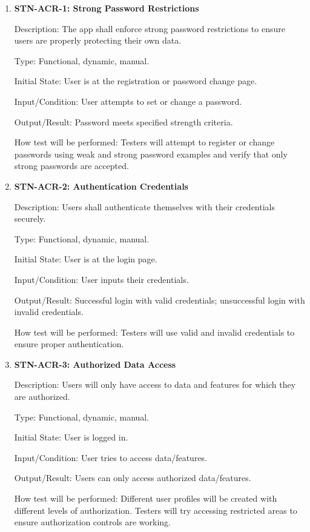 \documentclass[12pt, titlepage]{article}
\begin{document}
    \begin{enumerate}

        \item {\textbf{STN-ACR-1: Strong Password Restrictions}}

        Description: The app shall enforce strong password restrictions to ensure users are properly protecting their own data.

        Type: Functional, dynamic, manual.

        Initial State: User is at the registration or password change page.

        Input/Condition: User attempts to set or change a password.

        Output/Result: Password meets specified strength criteria.

        How test will be performed: Testers will attempt to register or change passwords using weak and strong password examples and verify that only strong passwords are accepted.


        \item{\textbf{STN-ACR-2: Authentication Credentials}}

        Description:  Users shall authenticate themselves with their credentials securely.

        Type: Functional, dynamic, manual.

        Initial State: User is at the login page.

        Input/Condition: User inputs their credentials.

        Output/Result: Successful login with valid credentials; unsuccessful login with invalid credentials.

        How test will be performed: Testers will use valid and invalid credentials to ensure proper authentication.


        \item{\textbf{STN-ACR-3: Authorized Data Access}}

        Description: Users will only have access to data and features for which they are authorized.

        Type: Functional, dynamic, manual.

        Initial State: User is logged in.

        Input/Condition: User tries to access data/features.

        Output/Result: Users can only access authorized data/features.

        How test will be performed: Different user profiles will be created with different levels of authorization. Testers will try accessing restricted areas to ensure authorization controls are working.

    \end{enumerate}
\end{document}
